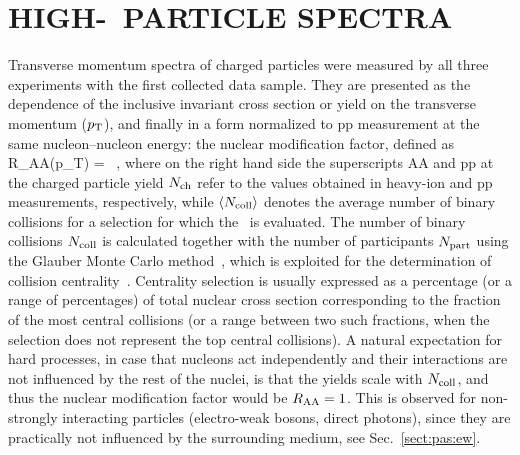 \section{HIGH-\pt\ PARTICLE SPECTRA}
\label{spectra}
Transverse momentum spectra of charged particles were measured by all three experiments with the first collected data sample. They are presented as the dependence of the inclusive invariant cross section or yield on the transverse momentum ($p_{\rm T}$), and finally in a form normalized to pp measurement at the same nucleon--nucleon energy: the nuclear modification factor, defined as
\be
R_{\rm AA}(p_{\rm T}) = \, ,
\label{eqks:RAA}
\ee
where on the right hand side the superscripts AA and pp at the charged particle yield $N_{\rm ch}$ refer to the values obtained in heavy-ion and pp measurements, respectively, while $\langle N_{\rm coll} \rangle$ denotes the average number of binary collisions for a selection for which the \Raa\ is evaluated. The number of binary collisions $N_{\rm coll}$ is calculated together with the number of participants $N_{\rm part}$ using the Glauber Monte Carlo method~\cite{Shor:1988vk,Alver:2008aq}, which is exploited for the determination of collision centrality~\cite{Miller:2007ri,Abelev:2013qoq}. Centrality selection is usually expressed as a percentage (or a range of percentages) of total nuclear cross section corresponding to the fraction of the most central collisions (or a range between two such fractions, when the selection does not represent the top central collisions). A natural expectation for hard processes, in case that nucleons act independently and their interactions are not influenced by the rest of the nuclei, is that the yields scale with $N_{\rm coll}$, and thus the nuclear modification factor would be $R_{\rm AA} = 1$. This is observed for non-strongly interacting particles (electro-weak bosons, direct photons), since they are practically not influenced by the surrounding medium, see Sec.~\ref{sect:pas:ew}.
